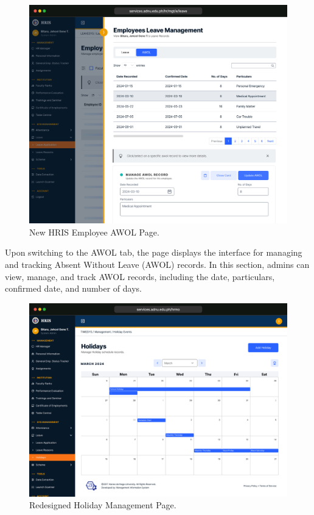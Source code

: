    \begin{figure}[H]
        \centering
        \includegraphics[width=1\linewidth]{figures/app/leave-awol.png}
        \caption{New HRIS Employee AWOL Page.}
        \label{fig:leave-awol}
    \end{figure}

    Upon switching to the AWOL tab, the page displays the interface for managing and tracking Absent Without Leave (AWOL) records. In this section, admins can view, manage, and track AWOL records, including the date, particulars, confirmed date, and number of days.

    \begin{figure}[H]
        \centering
        \includegraphics[width=1\linewidth]{figures/app/holiday.png}
        \caption{Redesigned Holiday Management Page.}
        \label{fig:holiday}
    \end{figure}

